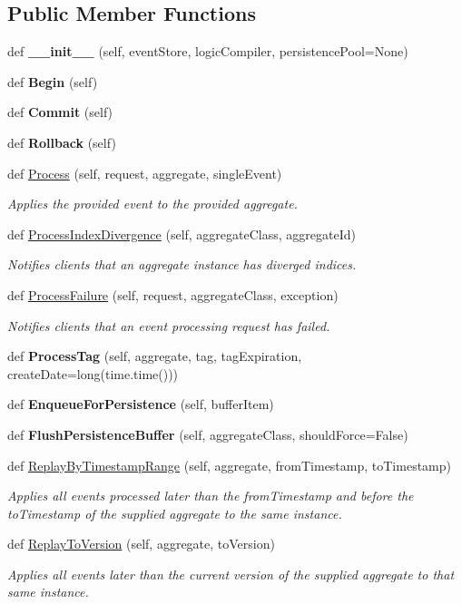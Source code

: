 \subsection*{Public Member Functions}
\begin{DoxyCompactItemize}
\item 
def {\bfseries \+\_\+\+\_\+init\+\_\+\+\_\+} (self, event\+Store, logic\+Compiler, persistence\+Pool=None)
\item 
def {\bfseries Begin} (self)
\item 
def {\bfseries Commit} (self)
\item 
def {\bfseries Rollback} (self)
\item 
def \hyperlink{group__Chronos_gaa715d77da2ab4a07c97ddc27b6691b69}{Process} (self, request, aggregate, single\+Event)
\begin{DoxyCompactList}\small\item\em Applies the provided event to the provided aggregate. \end{DoxyCompactList}\item 
def \hyperlink{group__Chronos_gaef2d2639259438495b17f1ab5903bbb7}{Process\+Index\+Divergence} (self, aggregate\+Class, aggregate\+Id)
\begin{DoxyCompactList}\small\item\em Notifies clients that an aggregate instance has diverged indices. \end{DoxyCompactList}\item 
def \hyperlink{group__Chronos_ga9ec5fe085282e9ee1909ee9b5752e44b}{Process\+Failure} (self, request, aggregate\+Class, exception)
\begin{DoxyCompactList}\small\item\em Notifies clients that an event processing request has failed. \end{DoxyCompactList}\item 
def {\bfseries Process\+Tag} (self, aggregate, tag, tag\+Expiration, create\+Date=long(time.\+time()))
\item 
def {\bfseries Enqueue\+For\+Persistence} (self, buffer\+Item)
\item 
def {\bfseries Flush\+Persistence\+Buffer} (self, aggregate\+Class, should\+Force=False)
\item 
def \hyperlink{group__Chronos_gab6aa538a4b382256b1b168a274adab7f}{Replay\+By\+Timestamp\+Range} (self, aggregate, from\+Timestamp, to\+Timestamp)
\begin{DoxyCompactList}\small\item\em Applies all events processed later than the from\+Timestamp and before the to\+Timestamp of the supplied aggregate to the same instance. \end{DoxyCompactList}\item 
def \hyperlink{group__Chronos_gae2b807dba975704f1e383eef0df911c6}{Replay\+To\+Version} (self, aggregate, to\+Version)
\begin{DoxyCompactList}\small\item\em Applies all events later than the current version of the supplied aggregate to that same instance. \end{DoxyCompactList}\end{DoxyCompactItemize}
